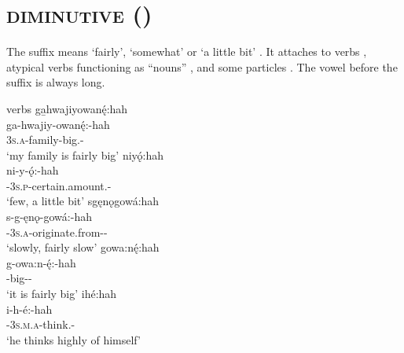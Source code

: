 \section{ \textsc{diminutive} ({\diminutive})} \label{-:hah}
The  {\diminutive} suffix means ‘fairly’, ‘somewhat’ or ‘a little bit’ . It attaches to verbs , atypical verbs functioning as “nouns” , and some particles . The vowel before the suffix is always long.

\ea\label{ex:hahex} verbs
\ea ga̱hwajiyowanę́:hah\\
\gll ga-hwajiy-owanę́:-hah\\
 \textsc{3s.a}-family-big.{\stative}-{\diminutive}\\
\glt `my family is fairly big'
\ex niyǫ́:hah\\
\gll ni-y-ǫ́:-hah\\
 {\partitive}-\textsc{3s.p}-certain.amount.{\stative}-{\diminutive}\\
\glt `few, a little bit'
\ex sgęnǫgowá:hah\\
\gll s-g-ęnǫ-gowá:-hah\\
 {\repetitive}-\textsc{3s.a}-originate.from-{\augmentative}-{\diminutive}\\
\glt `slowly, fairly slow'
\ex gowa:nę́:hah\\
\gll g-owa:n-ę́:-hah\\
 -big-{\stative}-{\diminutive}\\
\glt `it is fairly big'
\ex ihé:hah\\
\gll i-h-é:-hah\\
 {\prothetic}-\textsc{3s.m.a}-think.{\stative}-{\diminutive}\\
\glt `he thinks highly of himself'
\z
\z

